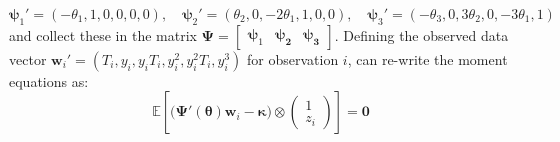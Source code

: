 \begin{equation}
  \boldsymbol{\psi}_1' = (-\theta_1, 1, 0, 0, 0, 0), \quad
  \boldsymbol{\psi}_2' = (\theta_2, 0, -2\theta_1, 1, 0, 0), \quad
  \boldsymbol{\psi}_3' = (-\theta_3, 0, 3\theta_2, 0, -3\theta_1, 1)
  \label{eq:psi_def}
\end{equation}
and collect these in the matrix
$\boldsymbol{\Psi} = \left[
  \begin{array}{ccc}
    \boldsymbol{\psi}_1 & \boldsymbol{\psi_2} & \boldsymbol{\psi_3}
\end{array}\right]$.
Defining the observed data vector $\mathbf{w}_i' = (T_i, y_i, y_iT_i, y_i^2, y_i^2 T_i, y_i^3)$ for observation $i$, can re-write the moment equations as:
\begin{equation}
\mathbb{E}\left[
  \big(\boldsymbol{\Psi}'(\boldsymbol{\theta})\mathbf{w}_i - \boldsymbol{\kappa}\big) \otimes 
\left(
\begin{array}{c}
  1 \\ z_i
\end{array}\right)
\right] = \mathbf{0}
\label{eq:MCs_endog}
\end{equation}


